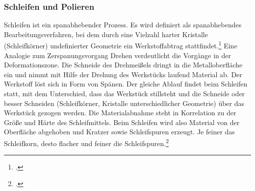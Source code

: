 \documentclass[12pt,a4paper,parskip]{scrartcl}
\begin{document}
\subsubsection{Schleifen und Polieren}
Schleifen ist ein spanabhebender Prozess. Es wird definiert als spanabhebendes Bearbeitungsverfahren, bei dem durch eine Vielzahl harter Kristalle (Schleifkörner) undefinierter Geometrie ein Werkstoffabtrag stattfindet.\footcite[Vgl.][15]{hsp}  Eine Analogie zum Zerspanungsvorgang Drehen verdeutlicht die Vorgänge in der Deformationszone. Die Schneide des Drehmeißels dringt in die Metalloberfläche ein und nimmt mit Hilfe der Drehung des Werkstücks laufend Material ab. Der Werkstoff löst sich in Form von Spänen. Der gleiche Ablauf findet beim Schleifen statt, mit dem Unterschied, dass das Werkstück stillsteht und die Schneide oder besser Schneiden (Schleifkörner, Kristalle unterschiedlicher Geometrie) über das Werkstück gezogen werden. Die Materialabnahme steht in Korrelation zu der Größe und Härte des Schleifmittels. Beim Schleifen wird also Material von der Oberfläche abgehoben und Kratzer sowie Schleifspuren erzeugt. Je feiner das Schleifkorn, desto flacher und feiner die Schleifspuren.\footcite[Vgl.][16-17]{hsp}  
\end{document}

